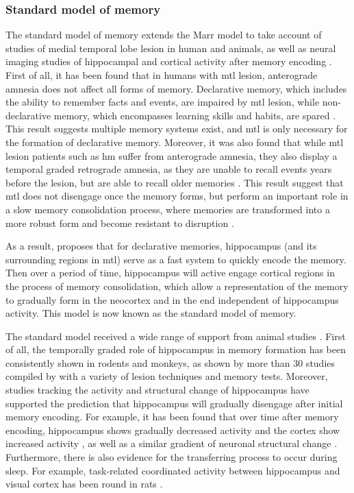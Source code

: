 \subsubsection{Standard model of memory \label{hpc-squire}}
The standard model of memory extends the Marr model to take account of studies of medial temporal lobe lesion in human and animals, as well as neural imaging studies of hippocampal and cortical activity after memory encoding \citep{squire92, squire09}. First of all, it has been found that in humans with \gls{mtl} lesion, anterograde amnesia does not affect all forms of memory. Declarative memory, which includes the ability to remember facts and events, are impaired by \gls{mtl} lesion, while non-declarative memory, which encompasses learning skills and habits, are spared \citep{cohen80, squire04}. This result suggests multiple memory systems exist, and \gls{mtl} is only necessary for the formation of declarative memory. Moreover, it was also found that while \gls{mtl} lesion patients such as \gls{hm} suffer from anterograde amnesia, they also display a temporal graded retrograde amnesia, as they are unable to recall events years before the lesion, but are able to recall older memories \citep{marslen-wilson75}. This result suggest that \gls{mtl} does not disengage once the memory forms, but perform an important role in a slow memory consolidation process, where memories are transformed into a more robust form and become resistant to disruption \citep{squire92}. 

As a result, \citet{squire92} proposes that for declarative memories, hippocampus (and its surrounding regions in \gls{mtl}) serve as a fast system to quickly encode the memory. Then over a period of time, hippocampus will active engage cortical regions in the process of memory consolidation, which allow a representation of the memory to gradually form in the neocortex and in the end independent of hippocampus activity. This model is now known as the standard model of memory. 

The standard model received a wide range of support from animal studies \citep{squire09}. First of all, the temporally graded role of hippocampus in memory formation has been consistently shown in rodents and monkeys, as shown by more than 30 studies compiled by \citet{frankland05} with a variety of lesion techniques and memory tests. Moreover, studies tracking the activity and structural change of hippocampus have supported the prediction that hippocampus will gradually disengage after initial memory encoding. For example, it has been found that over time after memory encoding, hippocampus shows gradually decreased activity and the cortex show increased activity \citep[e.g.,][]{bontempi99, frankland04a, takehara-nishiuchi06}, as well as a similar gradient of neuronal structural change \citep[e.g.][]{routtenberg00, maviel04, restivo09}. Furthermore, there is also evidence for the transferring process to occur during sleep. For example, task-related coordinated activity between hippocampus and visual cortex has been round in rats \citep{ji07}. 

